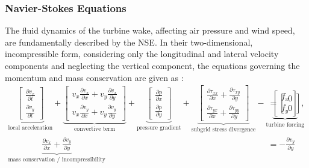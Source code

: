 \subsubsection{Navier-Stokes Equations}
The fluid dynamics of the turbine wake, affecting air pressure and wind speed, are fundamentally described by the NSE. In their two-dimensional, incompressible form, considering only the longitudinal and lateral velocity components and neglecting the vertical component, the equations governing the momentum and mass conservation are given as \cite{boersma2018control}:
\begin{align*}
    \underbrace{
        \begin{bmatrix}
            \frac{\partial v_x}{\partial t} \\[1mm]
            \frac{\partial v_y}{\partial t}
        \end{bmatrix}
    }_{\text{local acceleration}}
    +
    \underbrace{
        \begin{bmatrix}
            v_x \frac{\partial v_x}{\partial x} + v_y \frac{\partial v_x}{\partial y} \\[1mm]
            v_x \frac{\partial v_y}{\partial x} + v_y \frac{\partial v_y}{\partial y}
        \end{bmatrix}
    }_{\text{convective term}}
    +
    \underbrace{
        \begin{bmatrix}
            \frac{\partial p}{\partial x} \\[1mm]
            \frac{\partial p}{\partial y}
        \end{bmatrix}
    }_{\text{pressure gradient}}
    +
    \underbrace{
        \begin{bmatrix}
            \frac{\partial \tau_{xx}}{\partial x} + \frac{\partial \tau_{xy}}{\partial y} \\[1mm]
            \frac{\partial \tau_{yx}}{\partial x} + \frac{\partial \tau_{yy}}{\partial y}
        \end{bmatrix}
    }_{\text{subgrid stress divergence}}
    -
    \underbrace{
        \begin{bmatrix}
            f_x \\[1mm]
            f_y
        \end{bmatrix}
    }_{\text{turbine forcing}}
    &= 
    \begin{bmatrix} 0 \\ 0 \end{bmatrix}, \\[2mm]
    \underbrace{\frac{\partial v_x}{\partial x} + \frac{\partial v_y}{\partial y}}_{\text{mass conservation / incompressibility}} &=   -\frac{\partial v_y}{\partial y}
\end{align*}
